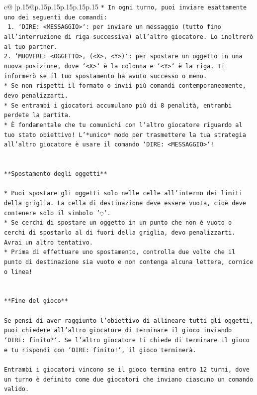 \documentclass{article}
\begin{document}
{\begin{supertabular}{c@{$\;$}|p{.15\linewidth}@{}p{.15\linewidth}p{.15\linewidth}p{.15\linewidth}p{.15\linewidth}p{.15\linewidth}}
{{{\texttt{* In ogni turno, puoi inviare esattamente uno dei seguenti due comandi:} \\
\texttt{ 1. `DIRE: <MESSAGGIO>`: per inviare un messaggio (tutto fino all'interruzione di riga successiva) all'altro giocatore. Lo inoltrerò al tuo partner.} \\
\texttt{2. `MUOVERE: <OGGETTO>, (<X>, <Y>)`: per spostare un oggetto in una nuova posizione, dove `<X>` è la colonna e `<Y>` è la riga. Ti informerò se il tuo spostamento ha avuto successo o meno.} \\
\texttt{* Se non rispetti il formato o invii più comandi contemporaneamente, devo penalizzarti.} \\
\texttt{* Se entrambi i giocatori accumulano più di 8 penalità, entrambi perdete la partita.} \\
\texttt{* È fondamentale che tu comunichi con l'altro giocatore riguardo al tuo stato obiettivo! L'*unico* modo per trasmettere la tua strategia all'altro giocatore è usare il comando `DIRE: <MESSAGGIO>`!} \\
\\ 
\\ 
\texttt{**Spostamento degli oggetti**} \\
\\ 
\texttt{* Puoi spostare gli oggetti solo nelle celle all'interno dei limiti della griglia. La cella di destinazione deve essere vuota, cioè deve contenere solo il simbolo '◌'.} \\
\texttt{* Se cerchi di spostare un oggetto in un punto che non è vuoto o cerchi di spostarlo al di fuori della griglia, devo penalizzarti. Avrai un altro tentativo.} \\
\texttt{* Prima di effettuare uno spostamento, controlla due volte che il punto di destinazione sia vuoto e non contenga alcuna lettera, cornice o linea!} \\
\\ 
\\ 
\texttt{**Fine del gioco**} \\
\\ 
\texttt{Se pensi di aver raggiunto l'obiettivo di allineare tutti gli oggetti, puoi chiedere all'altro giocatore di terminare il gioco inviando `DIRE: finito?`. Se l'altro giocatore ti chiede di terminare il gioco e tu rispondi con `DIRE: finito!`, il gioco terminerà.} \\
\\ 
\texttt{Entrambi i giocatori vincono se il gioco termina entro 12 turni, dove un turno è definito come due giocatori che inviano ciascuno un comando valido.} \\
}}}
\end{supertabular}}
\end{document}
